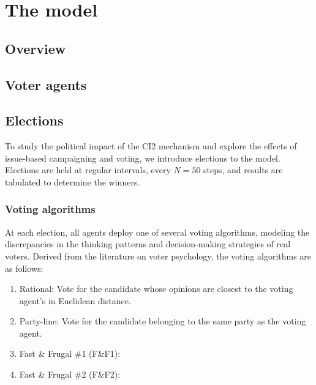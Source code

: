 \section{The model}
\label{sec:model}

\subsection{Overview}


\subsection{Voter agents}


\subsection{Elections}


To study the political impact of the CI2 mechanism and explore the effects of issue-based
campaigning and voting, we introduce elections to the model. Elections are held at regular
intervals, every $N=50$ steps, and results are tabulated to determine the winners. 

\subsubsection{Voting algorithms}


At each election, all agents deploy one of several voting algorithms, modeling the
discrepancies in the thinking patterns and decision-making strategies of real voters.
Derived from the literature on voter psychology, the voting algorithms are as follows:
\begin{enumerate}
	\item Rational: Vote for the candidate whose opinions are closest to the voting agent's in
	Euclidean distance.
	\item Party-line: Vote for the candidate belonging to the same party as the voting agent.
	\item Fast \& Frugal \#1 (F\&F1):  
	\item Fast \& Frugal \#2 (F\&F2):
\end{enumerate}



